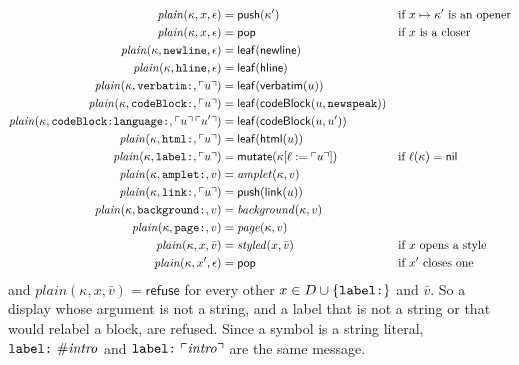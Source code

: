 \documentclass[11pt]{article}
\numberwithin{equation}{section}
\newcommand{\kw}[1]{\ensuremath{\mathsf{#1}}}
\newcommand{\str}[1]{\ensuremath{\text{\texttt{#1}}}}
\begin{document}
\begin{equation}\label{eq:lib-plain-def}
\begin{aligned}
\mathit{plain}(\kappa, x, \epsilon) &= \kw{push}(\kappa')
  && \text{if } x \mapsto \kappa' \text{ is an opener} \\
\mathit{plain}(\kappa, x, \epsilon) &= \kw{pop}
  && \text{if } x \text{ is a closer} \\
\mathit{plain}(\kappa, \str{newline}, \epsilon) &= \kw{leaf}(\kw{newline}) \\
\mathit{plain}(\kappa, \str{hline}, \epsilon) &= \kw{leaf}(\kw{hline}) \\
\mathit{plain}(\kappa, \str{verbatim:}, \ulcorner u \urcorner) &=
  \kw{leaf}(\kw{verbatim}(u)) \\
\mathit{plain}(\kappa, \str{codeBlock:}, \ulcorner u \urcorner) &=
  \kw{leaf}(\kw{codeBlock}(u, \str{newspeak})) \\
\mathit{plain}(\kappa, \str{codeBlock:language:},
  \ulcorner u \urcorner\,\ulcorner u' \urcorner) &= \kw{leaf}(\kw{codeBlock}(u, u')) \\
\mathit{plain}(\kappa, \str{html:}, \ulcorner u \urcorner) &=
  \kw{leaf}(\kw{html}(u)) \\
\mathit{plain}(\kappa, \str{label:}, \ulcorner u \urcorner) &=
  \kw{mutate}(\kappa[\ell := \ulcorner u \urcorner])
  && \text{if } \ell(\kappa) = \kw{nil} \\
\mathit{plain}(\kappa, \str{amplet:}, v) &= \mathit{amplet}(\kappa, v) \\
\mathit{plain}(\kappa, \str{link:}, \ulcorner u \urcorner) &=
  \kw{push}(\kw{link}(u)) \\
\mathit{plain}(\kappa, \str{background:}, v) &= \mathit{background}(\kappa, v) \\
\mathit{plain}(\kappa, \str{page:}, v) &= \mathit{page}(\kappa, v) \\
\mathit{plain}(\kappa, x, \bar v) &= \mathit{styled}(x, \bar v)
  && \text{if } x \text{ opens a style} \\
\mathit{plain}(\kappa, x', \epsilon) &= \kw{pop}
  && \text{if } x' \text{ closes one}
\end{aligned}
\end{equation}
and $\mathit{plain}(\kappa, x, \bar v) = \kw{refuse}$ for every other
$x \in D \cup \{\str{label:}\}$ and $\bar v$.  So a display whose argument is not a string, and a label that is not a
string or that would relabel a block, are refused.  Since a symbol is a
string literal, $\str{label:}~\#\mathit{intro}$ and
$\str{label:}~\ulcorner\mathit{intro}\urcorner$ are the same message.
\end{document}
